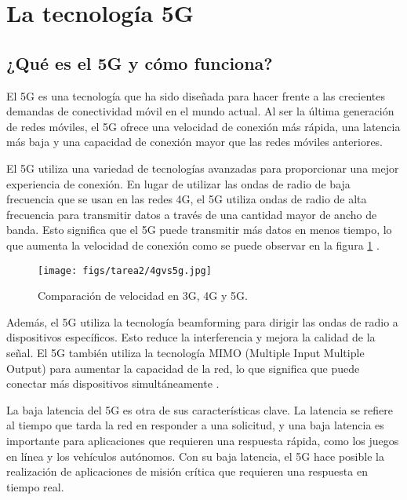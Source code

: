 \documentclass[12pt]{article}
\begin{document}
    \section{La tecnología 5G}
    
        \subsection{¿Qué es el 5G y cómo funciona?}

            El 5G es una tecnología que ha sido diseñada para hacer frente a las crecientes demandas de conectividad móvil en el mundo actual. Al ser la última generación de redes móviles, el 5G ofrece una velocidad de conexión más rápida, una latencia más baja y una capacidad de conexión mayor que las redes móviles anteriores.

            El 5G utiliza una variedad de tecnologías avanzadas para proporcionar una mejor experiencia de conexión. En lugar de utilizar las ondas de radio de baja frecuencia que se usan en las redes 4G, el 5G utiliza ondas de radio de alta frecuencia para transmitir datos a través de una cantidad mayor de ancho de banda. Esto significa que el 5G puede transmitir más datos en menos tiempo, lo que aumenta la velocidad de conexión como se puede observar en la figura \ref{fig:comparacion} \cite{sauter20185g}.

            \begin{figure}[!h]
                \centering
                \texttt{[image: figs/tarea2/4gvs5g.jpg]}
                \caption{Comparación de velocidad en 3G, 4G y 5G.}
                \label{fig:comparacion}
            \end{figure}
            
            Además, el 5G utiliza la tecnología beamforming para dirigir las ondas de radio a dispositivos específicos. Esto reduce la interferencia y mejora la calidad de la señal. El 5G también utiliza la tecnología MIMO (Multiple Input Multiple Output) para aumentar la capacidad de la red, lo que significa que puede conectar más dispositivos simultáneamente \cite{sauter20185g}.
            
            La baja latencia del 5G es otra de sus características clave. La latencia se refiere al tiempo que tarda la red en responder a una solicitud, y una baja latencia es importante para aplicaciones que requieren una respuesta rápida, como los juegos en línea y los vehículos autónomos. Con su baja latencia, el 5G hace posible la realización de aplicaciones de misión crítica que requieren una respuesta en tiempo real.
            
\end{document}
